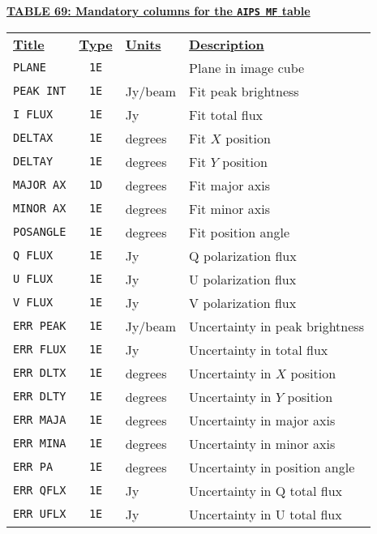 \documentclass[twoside]{article}
\begin{document}
\vfill\eject
\begin{center}
\underline{\bf{TABLE 69: Mandatory columns for the {\tt AIPS MF} table}}\\
\begin{tabular}{lcll}
\noalign{\vspace{2pt}} \label{ta:MFcols}
\underline{{\bf Title\vphantom{y}}} & \underline{\bf{Type}} &
   \underline{{\bf Units\vphantom{y}}} & \underline{\bf{Description}} \\
\noalign{\vspace{2pt}}
{\tt PLANE}    & {\tt 1E} &         & Plane in image cube \\
{\tt PEAK INT} & {\tt 1E} & Jy/beam & Fit peak brightness \\
{\tt I FLUX}   & {\tt 1E} & Jy      & Fit total flux \\
{\tt DELTAX}   & {\tt 1E} & degrees & Fit $X$ position \\
{\tt DELTAY}   & {\tt 1E} & degrees & Fit $Y$ position \\
{\tt MAJOR AX} & {\tt 1D} & degrees & Fit major axis \\
{\tt MINOR AX} & {\tt 1E} & degrees & Fit minor axis \\
{\tt POSANGLE} & {\tt 1E} & degrees & Fit position angle \\
{\tt Q FLUX}   & {\tt 1E} & Jy      & Q polarization flux \\
{\tt U FLUX}   & {\tt 1E} & Jy      & U polarization flux \\
{\tt V FLUX}   & {\tt 1E} & Jy      & V polarization flux \\
{\tt ERR PEAK} & {\tt 1E} & Jy/beam & Uncertainty in peak brightness \\
{\tt ERR FLUX} & {\tt 1E} & Jy      & Uncertainty in total flux \\
{\tt ERR DLTX} & {\tt 1E} & degrees & Uncertainty in $X$ position \\
{\tt ERR DLTY} & {\tt 1E} & degrees & Uncertainty in $Y$ position \\
{\tt ERR MAJA} & {\tt 1E} & degrees & Uncertainty in major axis \\
{\tt ERR MINA} & {\tt 1E} & degrees & Uncertainty in minor axis \\
{\tt ERR PA}   & {\tt 1E} & degrees & Uncertainty in position angle \\
{\tt ERR QFLX} & {\tt 1E} & Jy      & Uncertainty in Q total flux \\
{\tt ERR UFLX} & {\tt 1E} & Jy      & Uncertainty in U total flux \\

\end{tabular}
\end{center}
\end{document}
